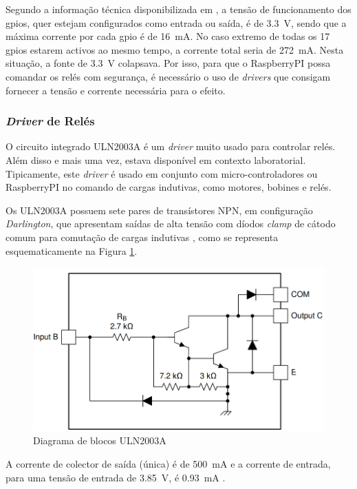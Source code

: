  Segundo a informação técnica disponibilizada em \cite{Raspberrytech}, a tensão de funcionamento dos \acrfull{gpio}s, quer estejam configurados como entrada ou saída, é de \SI{3.3}{\volt}, sendo que a máxima corrente por cada \acrshort{gpio} é de \SI{16}{\mA}. No caso extremo de todas os 17 \acrshort{gpio}s estarem activos ao mesmo tempo, a corrente total seria de \SI{272}{\mA}. Nesta situação, a fonte de \SI{3.3}{\volt} colapsava. 
 Por isso, para que o RaspberryPI possa comandar os relés com segurança, é necessário o uso de \textit{drivers} que consigam fornecer a tensão e corrente necessária para o efeito.
 
 \subsubsection{\textit{Driver} de Relés}
 O circuito integrado ULN2003A é um \textit{driver} muito usado para controlar relés. Além disso e mais uma vez, estava disponível em contexto laboratorial.
Tipicamente, este \textit{driver} é usado em conjunto com micro-controladores ou \gls{RaspberryPI} no comando de cargas indutivas, como motores, bobines e relés. 

Os ULN2003A possuem sete pares de transístores NPN, em configuração \textit{Darlington}, que apresentam saídas de alta tensão com díodos \textit{clamp} de cátodo comum para comutação de cargas indutivas \cite{ULN2003}, como se  representa esquematicamente na Figura \ref{fig:2003blocos}.

\begin{figure}[hbtp]
    \centering
    \includegraphics[width=1\textwidth]{figures/2003A_Darling.png}
    \caption{Diagrama de blocos ULN2003A \cite{ULN2003}}
    \label{fig:2003blocos}
\end{figure}

A corrente de colector de saída (única) é de \SI{500}{\mA} e a corrente de entrada, para uma tensão de entrada de \SI{3.85}{\volt}, é \SI{0.93}{\mA} \cite{ULN2003}.

